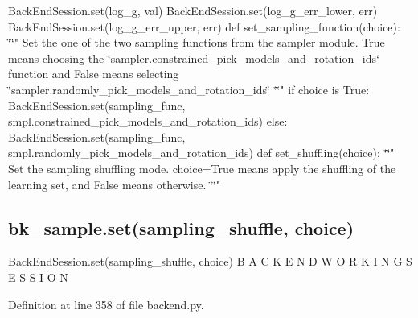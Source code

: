 Back\+End\+Session.\+set(\textquotesingle{}log\+\_\+g\textquotesingle{}, val) Back\+End\+Session.\+set(\textquotesingle{}log\+\_\+g\+\_\+err\+\_\+lower\textquotesingle{}, err) Back\+End\+Session.\+set(\textquotesingle{}log\+\_\+g\+\_\+err\+\_\+upper\textquotesingle{}, err) def set\+\_\+sampling\+\_\+function(choice)\+: \char`\"{}\char`\"{}" Set the one of the two sampling functions from the sampler module. True means choosing the \char`\"{}sampler.\+constrained\+\_\+pick\+\_\+models\+\_\+and\+\_\+rotation\+\_\+ids\char`\"{} function and False means selecting \char`\"{}sampler.\+randomly\+\_\+pick\+\_\+models\+\_\+and\+\_\+rotation\+\_\+ids\char`\"{} \char`\"{}\char`\"{}" if choice is True\+: Back\+End\+Session.\+set(\textquotesingle{}sampling\+\_\+func\textquotesingle{}, smpl.\+constrained\+\_\+pick\+\_\+models\+\_\+and\+\_\+rotation\+\_\+ids) else\+: Back\+End\+Session.\+set(\textquotesingle{}sampling\+\_\+func\textquotesingle{}, smpl.\+randomly\+\_\+pick\+\_\+models\+\_\+and\+\_\+rotation\+\_\+ids) def set\+\_\+shuffling(choice)\+: \char`\"{}\char`\"{}" Set the sampling shuffling mode. choice=True means apply the shuffling of the learning set, and False means otherwise. \char`\"{}\char`\"{}" \subsection*{bk\+\_\+sample.\+set(\textquotesingle{}sampling\+\_\+shuffle\textquotesingle{}, choice)}

Back\+End\+Session.\+set(\textquotesingle{}sampling\+\_\+shuffle\textquotesingle{}, choice) B A C K E N D W O R K I N G S E S S I O N 

Definition at line 358 of file backend.\+py.

